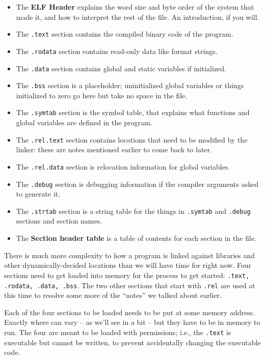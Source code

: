 \begin{itemize}
	\item The \textbf{ELF Header} explains the word size and byte order of the system that made it, and how to interpret the rest of the file. An introduction, if you will.
	\item The \texttt{.text} section contains the compiled binary code of the program.
	\item The \texttt{.rodata} section contains read-only data like format strings.
	\item The \texttt{.data} section contains global and static variables if initialized.
	\item The \texttt{.bss} section is a placeholder; uninitialized global variables or things initialized to zero go here but take no space in the file.
	\item The \texttt{.symtab} section is the symbol table, that explains what functions and global variables are defined in the program.
	\item The \texttt{.rel.text} section contains locations that need to be modified by the linker: these are notes mentioned earlier to come back to later.
	\item The \texttt{.rel.data} section is relocation information for global variables.
	\item The \texttt{.debug} section is debugging information if the compiler arguments asked to generate it.
	\item The \texttt{.strtab} section is a string table for the things in \texttt{.symtab} and \texttt{.debug} sections and section names.
	\item The \textbf{Section header table} is a table of contents for each section in the file.
\end{itemize}

There is much more complexity to how a program is linked against libraries and other dynamically-decided locations than we will have time for right now. Four sections need to get loaded into memory for the process to get started: \texttt{.text, .rodata, .data, .bss}. The two other sections that start with \texttt{.rel} are used at this time to resolve some more of the ``notes'' we talked about earlier.

Each of the four sections to be loaded needs to be put at some memory address. Exactly where can vary -- as we'll see in a bit -- but they have to be in memory to run. The four are meant to be loaded with permissions; i.e., the \texttt{.text} is executable but cannot be written, to prevent accidentally changing the executable code.

